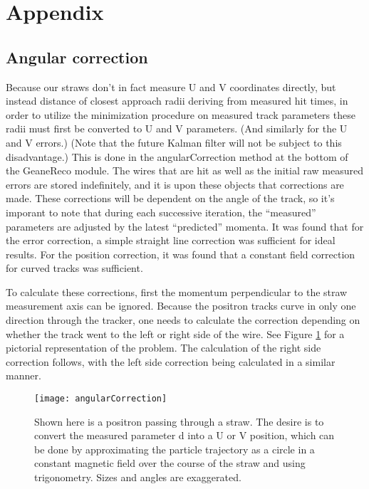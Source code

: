 \section{Appendix}

\subsection{Angular correction}

  Because our straws don't in fact measure U and V coordinates directly, but instead distance of closest approach radii deriving from measured hit times, in order to utilize the minimization procedure on measured track parameters these radii must first be converted to U and V parameters. (And similarly for the U and V errors.) (Note that the future Kalman filter will not be subject to this disadvantage.) This is done in the angularCorrection method at the bottom of the GeaneReco module. The wires that are hit as well as the initial raw measured errors are stored indefinitely, and it is upon these objects that corrections are made. These corrections will be dependent on the angle of the track, so it's imporant to note that during each successive iteration, the ``measured'' parameters are adjusted by the latest ``predicted'' momenta. It was found that for the error correction, a simple straight line correction was sufficient for ideal results. For the position correction, it was found that a constant field correction for curved tracks was sufficient.

  To calculate these corrections, first the momentum perpendicular to the straw measurement axis can be ignored. Because the positron tracks curve in only one direction through the tracker, one needs to calculate the correction depending on whether the track went to the left or right side of the wire. See Figure \ref{fig:angularCorrection} for a pictorial representation of the problem. The calculation of the right side correction follows, with the left side correction being calculated in a similar manner.

\begin{figure}[]
\caption{Shown here is a positron passing through a straw. The desire is to convert the measured parameter d into a U or V position, which can be done by approximating the particle trajectory as a circle in a constant magnetic field over the course of the straw and using trigonometry. Sizes and angles are exaggerated.}
\centering
\texttt{[image: angularCorrection]}
\label{fig:angularCorrection}
\end{figure}

